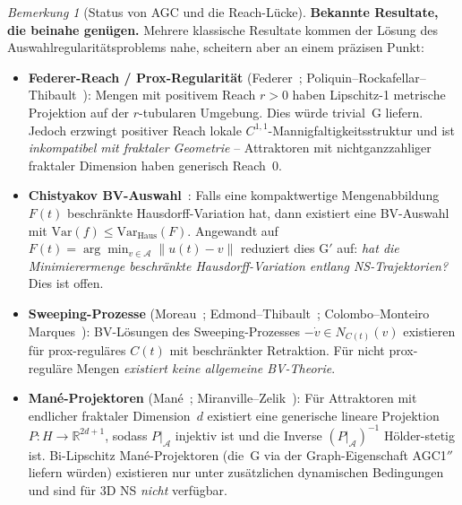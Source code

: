 \documentclass[12pt,a4paper]{article}
\theoremstyle{definition}
\theoremstyle{plain}
\theoremstyle{remark}
\newtheorem{remark}[definition]{Bemerkung}
\begin{document}
\begin{remark}[Status von AGC und die Reach-Lücke]
\medskip\noindent
\textbf{Bekannte Resultate, die beinahe genügen.}\;
Mehrere klassische Resultate kommen der Lösung des Auswahlregularitätsproblems nahe,
scheitern aber an einem präzisen Punkt:
\begin{itemize}
  \item \textbf{Federer-Reach / Prox-Regularität}
    (Federer~\cite{Federer1959}; Poliquin--Rockafellar--Thibault~\cite{PoliquinRockafellarThibault2000}):
    Mengen mit positivem Reach $r > 0$ haben Lipschitz-1 metrische Projektion
    auf der $r$-tubularen Umgebung. Dies würde trivial~G liefern.
    Jedoch erzwingt positiver Reach lokale $C^{1,1}$-Mannigfaltigkeitsstruktur
    und ist \emph{inkompatibel mit fraktaler Geometrie} -- Attraktoren
    mit nichtganzzahliger fraktaler Dimension haben generisch Reach~$0$.
  \item \textbf{Chistyakov BV-Auswahl}~\cite{Chistyakov2004}:
    Falls eine kompaktwertige Mengenabbildung $F(t)$ beschränkte Hausdorff-Variation hat,
    dann existiert eine BV-Auswahl mit
    $\mathrm{Var}(f) \le \mathrm{Var}_{\mathrm{Haus}}(F)$.
    Angewandt auf $F(t) = \arg\min_{v \in \mathcal{A}} \|u(t)-v\|$
    reduziert dies G$'$ auf: \emph{hat die Minimierermenge beschränkte
    Hausdorff-Variation entlang NS-Trajektorien?} Dies ist offen.
  \item \textbf{Sweeping-Prozesse}
    (Moreau~\cite{Moreau1977}; Edmond--Thibault~\cite{EdmondThibault2006}; Colombo--Monteiro Marques~\cite{ColomboMonteiroMarques2003}):
    BV-Lösungen des Sweeping-Prozesses $-\dot{v} \in N_{C(t)}(v)$
    existieren für prox-reguläres $C(t)$ mit beschränkter Retraktion.
    Für nicht prox-reguläre Mengen \emph{existiert keine allgemeine BV-Theorie}.
  \item \textbf{Man\'e-Projektoren}
    (Man\'e~\cite{Mane1981}; Miranville--Zelik~\cite{MiranvilleZelik2008}):
    Für Attraktoren mit endlicher fraktaler Dimension~$d$ existiert eine
    generische lineare Projektion $P : H \to \mathbb{R}^{2d+1}$, sodass
    $P|_{\mathcal{A}}$ injektiv ist und die Inverse
    $(P|_{\mathcal{A}})^{-1}$ H\"older-stetig ist.
    Bi-Lipschitz Man\'e-Projektoren (die~G via der Graph-Eigenschaft
    AGC1$''$ liefern würden) existieren nur unter zusätzlichen dynamischen Bedingungen
    und sind für 3D NS \emph{nicht} verfügbar.
\end{itemize}


\end{remark}
\end{document}

